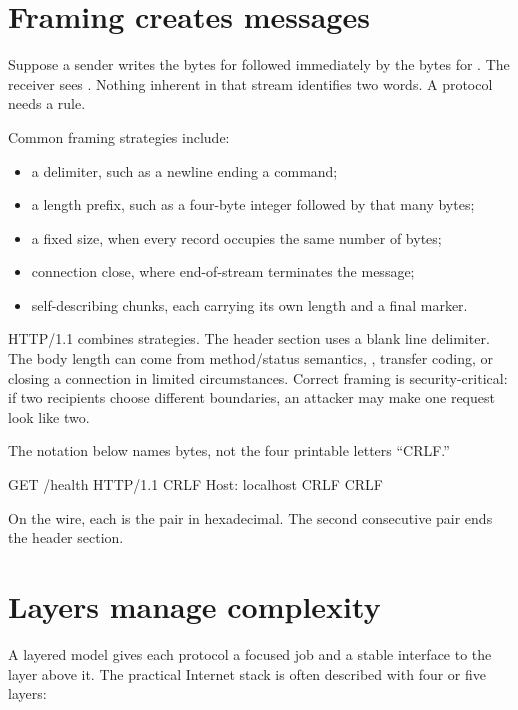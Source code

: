 \section{Framing creates messages}

Suppose a sender writes the bytes for  followed immediately by the
bytes for . The receiver sees . Nothing inherent
in that stream identifies two words. A protocol needs a  rule.

Common framing strategies include:

\begin{itemize}
  \item a delimiter, such as a newline ending a command;
  \item a length prefix, such as a four-byte integer followed by that many bytes;
  \item a fixed size, when every record occupies the same number of bytes;
  \item connection close, where end-of-stream terminates the message;
  \item self-describing chunks, each carrying its own length and a final marker.
\end{itemize}

HTTP/1.1 combines strategies. The header section uses a blank line delimiter.
The body length can come from method/status semantics, ,
transfer coding, or closing a connection in limited circumstances. Correct
framing is security-critical: if two recipients choose different boundaries,
an attacker may make one request look like two.

\begin{wireview}
The notation below names bytes, not the four printable letters ``CRLF.''
\begin{wiremessage}
GET /health HTTP/1.1 CRLF
Host: localhost CRLF
CRLF
\end{wiremessage}
On the wire, each  is the pair  in hexadecimal. The
second consecutive pair ends the header section.
\end{wireview}

\section{Layers manage complexity}

A layered model gives each protocol a focused job and a stable interface to the
layer above it. The practical Internet stack is often described with four or
five layers:

